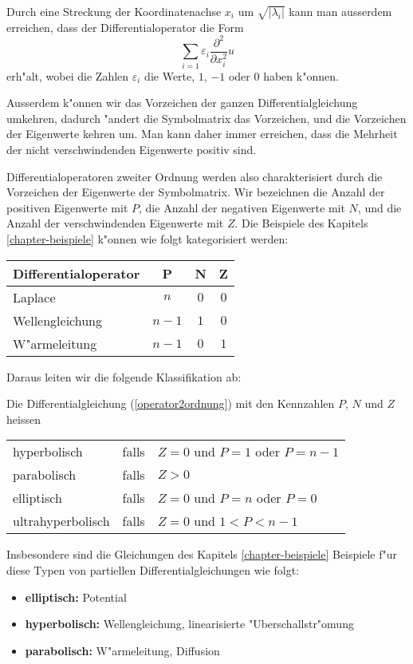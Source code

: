 Durch eine Streckung der Koordinatenachse $x_i$ um $\sqrt{|\lambda_i|}$
kann man ausserdem erreichen, dass der Differentialoperator die
Form
\[
\sum_{i=1}\varepsilon_i\frac{\partial^2}{\partial x_i^2}u
\]
erh"alt, wobei die Zahlen $\varepsilon_i$ die Werte, $1$, $-1$ oder $0$
haben k"onnen.

Ausserdem k"onnen wir das Vorzeichen der ganzen Differentialgleichung
umkehren, dadurch "andert die Symbolmatrix das Vorzeichen, und die
Vorzeichen der Eigenwerte kehren um.
Man kann daher immer erreichen, dass die Mehrheit der nicht
verschwindenden Eigenwerte positiv sind.

Differentialoperatoren zweiter Ordnung werden also charakterisiert durch
die Vorzeichen der Eigenwerte der Symbolmatrix. Wir bezeichnen die Anzahl
der positiven Eigenwerte mit $P$, die Anzahl der negativen Eigenwerte
mit $N$, und die Anzahl der verschwindenden Eigenwerte mit $Z$.
Die Beispiele des Kapitels \ref{chapter-beispiele} k"onnen wie
folgt kategorisiert werden:
\begin{center}
\begin{tabular}{l|ccc}
Differentialoperator&P&N&Z
\\
\hline
Laplace&
$n$&$0$&$0$
\\
Wellengleichung&
$n-1$&$1$&$0$
\\
W"armeleitung&
$n-1$&$0$&$1$
\end{tabular}
\end{center}
Daraus leiten wir die folgende Klassifikation ab:

\begin{definition} Die Differentialgleichung 
(\ref{operator2ordnung})
mit den Kennzahlen $P$, $N$ und $Z$ heissen
\begin{center}
\begin{tabular}{lcl}
hyperbolisch&falls&$Z=0$ und $P=1$ oder $P=n-1$\\
parabolisch&falls&$Z>0$\\
elliptisch&falls&$Z=0$ und $P=n$ oder $P=0$\\
ultrahyperbolisch&falls&$Z=0$ und $1<P<n-1$
\end{tabular}
\end{center}
\end{definition}
Insbesondere sind die Gleichungen des Kapitels \ref{chapter-beispiele}
Beispiele f"ur diese Typen von partiellen Differentialgleichungen
wie folgt:
\begin{itemize}
\item {\bf elliptisch:} Potential
\item {\bf hyperbolisch:} Wellengleichung, linearisierte "Uberschallstr"omung
\item {\bf parabolisch:} W"armeleitung, Diffusion
\end{itemize}

